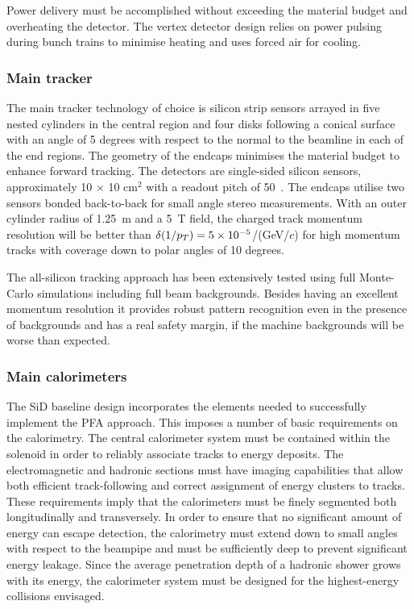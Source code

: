 Power delivery must be accomplished without exceeding the material budget and
overheating the detector.  The vertex detector 
design relies on power pulsing during bunch trains to minimise heating 
and uses forced air for cooling. 

\subsubsection{Main tracker}
The main tracker technology of
choice is silicon strip sensors arrayed in five nested cylinders in the central
region and four disks following a conical surface with an angle of 5 degrees
with respect to the normal to the beamline in each of the end regions. The geometry of the endcaps
minimises the material budget to enhance forward tracking. The detectors are
single-sided silicon sensors, approximately 10 $\times$ 10 cm$^2$ with a readout
pitch of 50~\micron. The endcaps utilise two sensors bonded back-to-back for
small angle stereo measurements. With an outer cylinder radius of 1.25~m
and a 5~T field, the charged track momentum resolution will be better than
$\delta (1/p_T) = 5 \times 10^{-5} $/(GeV/$c$) for high momentum tracks with coverage down to polar angles of 10 degrees.

The all-silicon tracking approach has been extensively tested using full Monte-Carlo
simulations including full beam backgrounds. Besides having an excellent momentum resolution
it provides robust pattern recognition even in the presence of backgrounds and has a
real safety margin, if the machine backgrounds will be worse than expected.

\subsubsection{Main calorimeters}

The SiD  baseline design incorporates the elements needed to
successfully implement the PFA approach. This imposes a number of
basic requirements on the calorimetry. The central calorimeter
system must be contained within the solenoid in order to reliably associate
tracks to energy deposits. The electromagnetic and hadronic sections
must have imaging capabilities that allow both efficient
track-following and correct assignment of energy clusters to tracks. These
requirements imply that the calorimeters must be finely segmented both
longitudinally and transversely. In order to ensure that no significant amount
of energy can escape detection, the calorimetry must extend down to small
angles with respect to the beampipe and must be sufficiently deep to prevent
significant energy leakage. Since the average penetration depth of a hadronic
shower grows with its energy, the calorimeter system must be designed for the
highest-energy collisions envisaged.

